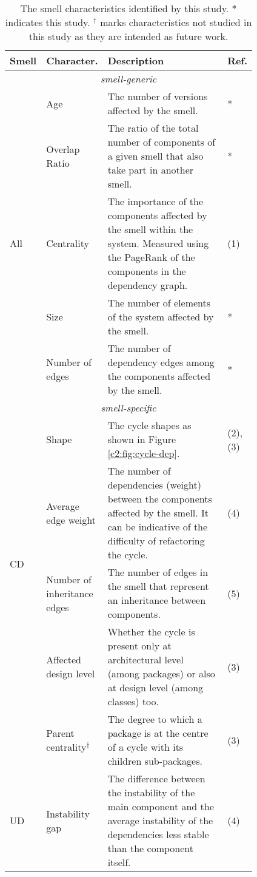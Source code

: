 \begin{table}[]
    \footnotesize
    \centering
    \caption{The smell characteristics identified by this study. * indicates this study. $^\dagger$ marks characteristics not studied in this study as they are intended as future work.}
    \label{tab:smell-characteristics}
    \begin{tabular}{p{0.035\linewidth}p{0.15\linewidth}p{0.60\linewidth}p{0.025\linewidth}}
    \toprule
    \textbf{Smell} & \textbf{Character.} & \textbf{Description} & \textbf{Ref.} \\ \midrule
    \multicolumn{4}{c}{\itshape smell-generic}\\\midrule
    \multirow{5}{*}{All} & Age & The number of versions affected by the smell. & * \\
     & Overlap Ratio & The ratio of the total number of components of a given smell that also take part in another smell. & * \\
     & Centrality & The importance of the components affected by the smell within the system. Measured using the PageRank of the components in the dependency graph. & (1) \\
     & Size & The number of elements of the system affected by the smell. & * \\
     & Number of edges & The number of dependency edges among the components affected by the smell. & * \\ \midrule
    \multicolumn{4}{c}{\itshape smell-specific}\\\midrule
    \multirow{4}{0.1\linewidth}{CD} & Shape & The cycle shapes as shown in Figure \ref{c2:fig:cycle-dep}. & (2), (3)\\
    & Average edge weight &  The number of dependencies (weight) between the components affected by the smell. It can be indicative of the difficulty of refactoring the cycle. & (4)\\
     & Number of inheritance edges & The number of edges in the smell that represent an inheritance between components. & (5) \\
     & Affected design level & Whether the cycle is present only at architectural level (among packages) or also at design level (among classes) too. & (3) \\
     & Parent centrality$^\dagger$ & The degree to which a package is at the centre of a cycle with its children sub-packages. & (3)\\ \midrule
     \multirow{2}{0.1\linewidth}{UD} & Instability gap & The difference between the instability of the main component and the average instability of the dependencies less stable than the component itself. & (4) \\

\end{tabular}
\end{table}
